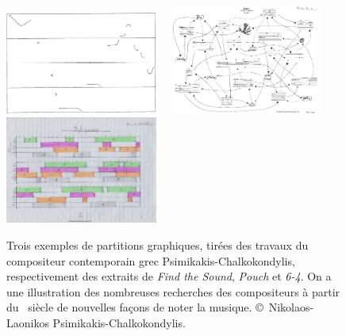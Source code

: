 \documentclass[a4paper,12pt]{article}
\begin{document}
\begin{figure}[h!]
\begin{center}
\includegraphics[width=5cm]{images/laonikos1.png}~~
\includegraphics[width=5cm]{images/laonikos2.png}~~
\includegraphics[width=5cm]{images/laonikos3.png}
\label{graphicalscore}
\caption{\footnotesize Trois exemples de partitions graphiques, tirées des travaux du compositeur contemporain grec Psimikakis-Chalkokondylis, respectivement des extraits de \emph{Find the Sound}, \emph{Pouch} et \emph{6-4}. On a une illustration des nombreuses recherches des compositeurs à partir du \XXe~siècle de nouvelles façons de noter la musique. \copyright~Nikolaos-Laonikos Psimikakis-Chalkokondylis.}
\end{center}
\end{figure}
\end{document}
